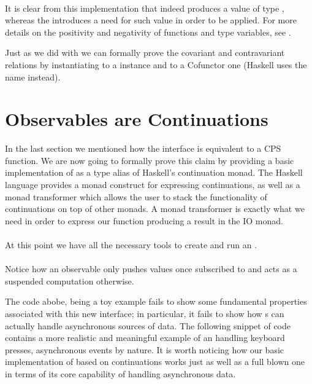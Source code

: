 \\

It is clear from this implementation that  indeed produces a value of type , whereas the  introduces a need for such value in order to be applied. For more details on the positivity and negativity of functions and type variables, see \cite{pos-neg}\cite{pos-neg2}.

Just as we did with  we can formally prove the covariant and contravariant relations by instantiating  to a  instance and  to a Cofunctor one (Haskell uses the name  instead).\\


\section{Observables are Continuations}

In the last section we mentioned how the  interface is equivalent to a CPS function. We are now going to formally prove this claim by providing a basic implementation of  as a type alias of Haskell's continuation monad. The Haskell language provides a monad construct for expressing continuations, as well as a monad transformer which allows the user to stack the functionality of continuations on top of other monads. A monad transformer is exactly what we need in order to express our  function producing a result in the IO monad.\\

\\

At this point we have all the necessary tools to create and run an .\\

\\

Notice how an observable only pushes values once subscribed to and acts as a suspended computation otherwise. 

The code abobe, being a toy example fails to show some fundamental properties associated with this new interface; in particular, it fails to show how s can actually handle asynchronous sources of data. The following snippet of code contains a more realistic and meaningful example of an  handling keyboard presses, asynchronous events by nature. It is worth noticing how our basic implementation of  based on continuations works just as well as a full blown one in terms of its core capability of handling asynchronous data.\\ 

